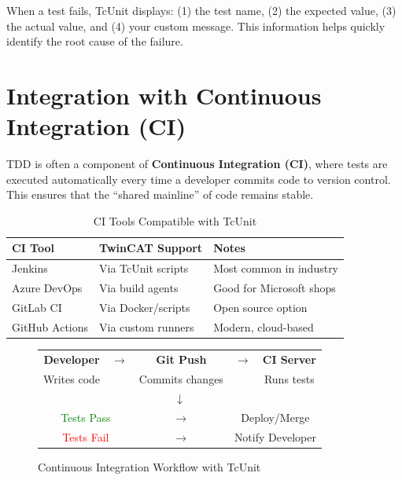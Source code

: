\documentclass[11pt,a4paper]{article}
\begin{document}
\begin{notebox}
When a test fails, TcUnit displays: (1) the test name, (2) the expected value, (3) the actual value, and (4) your custom message. This information helps quickly identify the root cause of the failure.
\end{notebox}

\section{Integration with Continuous Integration (CI)}

TDD is often a component of \textbf{Continuous Integration (CI)}, where tests are executed automatically every time a developer commits code to version control. This ensures that the ``shared mainline'' of code remains stable.

\begin{table}[h]
\centering
\begin{tabular}{@{}lll@{}}
\toprule
\textbf{CI Tool} & \textbf{TwinCAT Support} & \textbf{Notes} \\
\midrule
Jenkins & Via TcUnit scripts & Most common in industry \\
Azure DevOps & Via build agents & Good for Microsoft shops \\
GitLab CI & Via Docker/scripts & Open source option \\
GitHub Actions & Via custom runners & Modern, cloud-based \\
\bottomrule
\end{tabular}
\caption{CI Tools Compatible with TcUnit}
\end{table}

\begin{figure}[h]
\centering
\begin{tabular}{|c|c|c|c|c|}
\hline
\textbf{Developer} & $\rightarrow$ & \textbf{Git Push} & $\rightarrow$ & \textbf{CI Server} \\
Writes code & & Commits changes & & Runs tests \\
\hline
\multicolumn{5}{c}{$\downarrow$} \\
\hline
\multicolumn{2}{|c|}{\textcolor{green}{Tests Pass}} & $\rightarrow$ & \multicolumn{2}{c|}{Deploy/Merge} \\
\multicolumn{2}{|c|}{\textcolor{red}{Tests Fail}} & $\rightarrow$ & \multicolumn{2}{c|}{Notify Developer} \\
\hline
\end{tabular}
\caption{Continuous Integration Workflow with TcUnit}
\end{figure}
\end{document}
